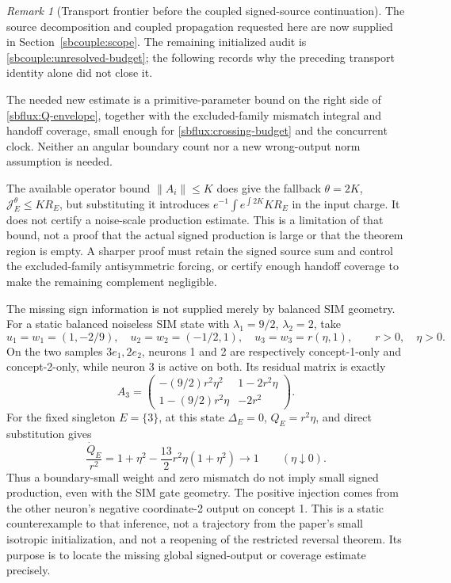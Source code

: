 \documentclass{article} %
\theoremstyle{plain}
\theoremstyle{definition}
\theoremstyle{remark}
\newtheorem{remark}[theorem]{Remark}
\begin{document}
\begin{remark}[Transport frontier before the coupled signed-source continuation]
\label{sbflux:frontier}
The source decomposition and coupled propagation requested here are now supplied in Section~\ref{sbcouple:scope}. The remaining initialized audit is \eqref{sbcouple:unresolved-budget}; the following records why the preceding transport identity alone did not close it.

The needed new estimate is a primitive-parameter bound on the right side
of \eqref{sbflux:Q-envelope}, together with the excluded-family mismatch
integral and handoff coverage, small enough for
\eqref{sbflux:crossing-budget} and the concurrent clock. Neither an angular
boundary count nor a new wrong-output norm assumption is needed.

The available operator bound $\|A_i\|\le K$ does give the fallback
$\theta=2K$, $\mathcal J_E^\theta\le K R_E$, but substituting it introduces
$e^{-1}\int e^{\int2K}KR_E$ in the input charge. It does not certify a
noise-scale production estimate. This is a limitation of that bound, not
a proof that the actual signed production is large or that the theorem
region is empty. A sharper proof must retain the signed source sum and
control the excluded-family antisymmetric forcing, or certify enough
handoff coverage to make the remaining complement negligible.

The missing sign information is not supplied merely by balanced SIM
geometry. For a static balanced noiseless SIM state with
$\lambda_1=9/2$, $\lambda_2=2$, take
\[
 u_1=w_1=(1,-2/9),\quad u_2=w_2=(-1/2,1),\quad
 u_3=w_3=r(\eta,1),\qquad r>0,\quad\eta>0.
\]
On the two samples $3e_1,2e_2$, neurons 1 and 2 are respectively
concept-1-only and concept-2-only, while neuron 3 is active on both.
Its residual matrix is exactly
\[
 A_3=\begin{pmatrix}
 -(9/2)r^2\eta^2&1-2r^2\eta\\
 1-(9/2)r^2\eta&-2r^2
 \end{pmatrix}.
\]
For the fixed singleton $E=\{3\}$, at this state $\Delta_E=0$,
$Q_E=r^2\eta$, and direct substitution gives
\[
 \frac{\dot Q_E}{r^2}
 =1+\eta^2-\frac{13}{2}r^2\eta(1+\eta^2)
 \longrightarrow1\qquad(\eta\downarrow0).
\]
Thus a boundary-small weight and zero mismatch do not imply small signed
production, even with the SIM gate geometry. The positive injection comes
from the other neuron's negative coordinate-2 output on concept 1.
This is a static counterexample to that inference, not a trajectory from
the paper's small isotropic initialization, and not a reopening of the
restricted reversal theorem. Its purpose is to locate the missing global
signed-output or coverage estimate precisely.


\end{remark}
\end{document}
